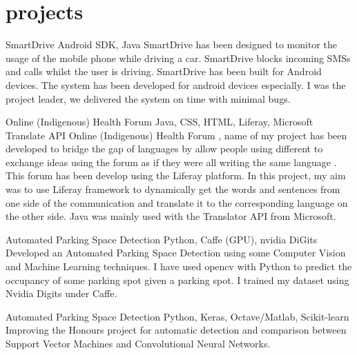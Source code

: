 \documentclass[]{friggeri-cv}
\begin{document}
\section{projects}
\begin{entrylist}
	
	\entry
	{}
	{SmartDrive {\normalfont Android SDK, Java}}
	{}
	{SmartDrive has been designed to monitor the usage of the mobile phone while driving a car. SmartDrive blocks incoming SMSs and calls whilst the user is driving. SmartDrive has been built for Android devices. The system has been developed for android devices especially. I was the project leader, we delivered the system on time with minimal bugs.}
	  
	
	\entry
	{}
	{Online (Indigenous) Health Forum {\normalfont Java, CSS, HTML, Liferay, Microsoft Translate API}}
	{}
	{Online (Indigenous) Health Forum , name of my project has been developed to bridge the gap of languages by allow people using different to exchange ideas using the forum as if they were all writing the same language . This forum has been develop using the Liferay platform. In this project, my aim was to use Liferay framework to dynamically get the words and sentences from one side of the communication and translate it to the corresponding language on the other side. Java was mainly used with the Translator API from Microsoft.}
	  
	
	\entry
	{}
	{Automated Parking Space Detection {\normalfont Python, Caffe (GPU), nvidia DiGits}}
	{}
	{Developed an Automated Parking Space Detection using some Computer Vision and Machine Learning techniques. I have used opencv with Python to predict the occupancy of some parking spot given a parking spot. I trained my dataset using Nvidia Digits under Caffe.}
	  
	
	\entry
	{}
	{Automated Parking Space Detection {\normalfont Python, Keras, Octave/Matlab, Scikit-learn}}
	{}
	{Improving the Honours project for automatic detection and comparison between Support Vector Machines and Convolutional Neural Networks.}
	  
\end{entrylist}
\end{document}
